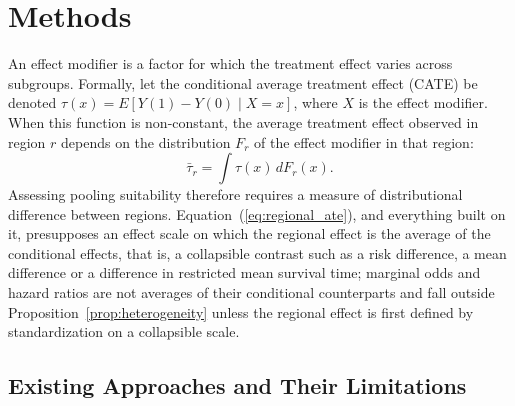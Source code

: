 \documentclass[AMA,Times1COL]{WileyNJDv5}
\begin{document}
\section{Methods}\label{sec:methods}

An effect modifier is a factor for which the treatment effect varies across subgroups. Formally, let the conditional average treatment effect (CATE) be denoted $\tau(x) = E[Y(1) - Y(0) \mid X = x]$, where $X$ is the effect modifier. When this function is non-constant, the average treatment effect observed in region $r$ depends on the distribution $F_r$ of the effect modifier in that region:
\begin{equation}
\bar{\tau}_r = \int \tau(x) \, dF_r(x).
\label{eq:regional_ate}
\end{equation}
Assessing pooling suitability therefore requires a measure of distributional difference between regions. Equation~(\ref{eq:regional_ate}), and everything built on it, presupposes an effect scale on which the regional effect is the average of the conditional effects, that is, a collapsible contrast such as a risk difference, a mean difference or a difference in restricted mean survival time; marginal odds and hazard ratios are not averages of their conditional counterparts and fall outside Proposition~\ref{prop:heterogeneity} unless the regional effect is first defined by standardization on a collapsible scale.

\subsection{Existing Approaches and Their Limitations}\label{sec:existing}
\end{document}
